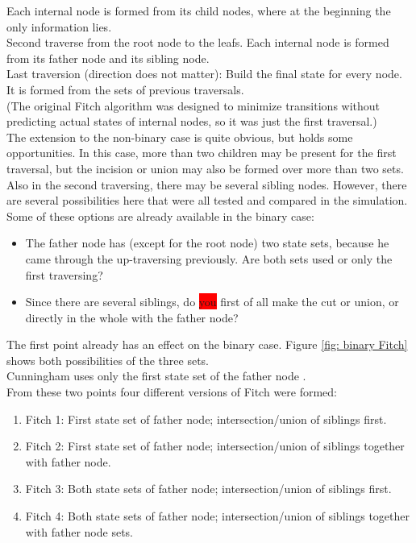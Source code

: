         Each internal node is formed from its child nodes, where at the beginning the only information
        lies. \\
      Second traverse from the root node to the leafs. Each internal node is formed from its father node 
        and its sibling node. \\
      Last traversion (direction does not matter): Build the final state for every node. It is formed 
        from the sets of previous traversals. \\
      (The original Fitch algorithm was designed to minimize transitions without predicting actual states 
        of internal nodes, so it was just the first traversal.) \\
      The extension to the non-binary case is quite obvious, but holds some opportunities. In this case, 
        more than two children may be present for the first traversal, but the incision or union may 
        also be formed over more than two sets. Also in the second traversing, there may be several 
        sibling nodes. However, there are several possibilities here that were all tested and compared 
        in the simulation. Some of these options are already available in the binary case:
      \begin{itemize}
        \item The father node has (except for the root node) two state sets, because he came through 
          the up-traversing previously. Are both sets used or only the first traversing?
        \item Since there are several siblings, do \colorbox{red}{you} first of all make the cut or union, 
          or directly in the whole with the father node?
      \end{itemize}
      The first point already has an effect on the binary case. Figure \ref{fig: binary Fitch} shows 
        both possibilities of the three sets. \\
      Cunningham uses only the first state set of the father node \cite{Cunningham1998}. \\
      From these two points four different versions of Fitch were formed:
      \begin{enumerate}
        \item Fitch 1: First state set of father node; intersection/union of siblings first.
        \item Fitch 2: First state set of father node; intersection/union of siblings together with father node.
        \item Fitch 3: Both state sets of father node; intersection/union of siblings first.
        \item Fitch 4: Both state sets of father node; intersection/union of siblings together with father node sets.
      \end{enumerate}
